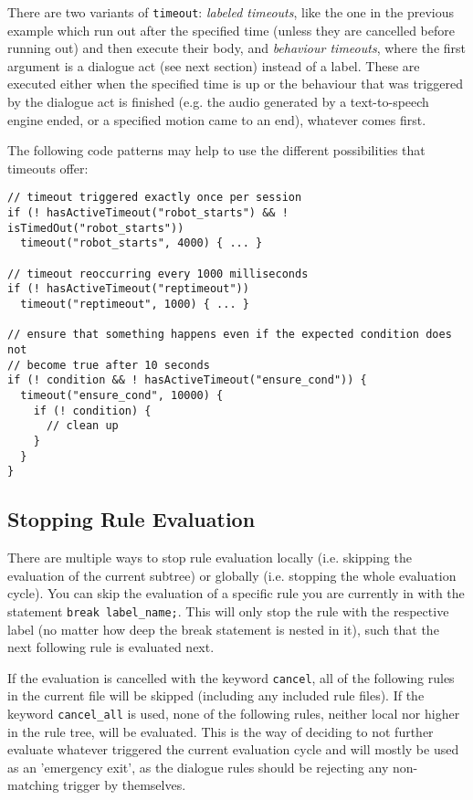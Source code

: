 There are two variants of \texttt{timeout}: \emph{labeled timeouts}, like the
one in the previous example which run out after the specified time (unless they
are cancelled before running out) and then execute their body, and
\emph{behaviour timeouts}, where the first argument is a dialogue act (see next
section) instead of a label. These are executed either when the specified time
is up or the behaviour that was triggered by the dialogue act is finished
(e.g. the audio generated by a text-to-speech engine ended, or a specified
motion came to an end), whatever comes first.

The following code patterns may help to use the different possibilities that
timeouts offer:

{\small%
\begin{lstlisting}
// timeout triggered exactly once per session
if (! hasActiveTimeout("robot_starts") && ! isTimedOut("robot_starts"))
  timeout("robot_starts", 4000) { ... }

// timeout reoccurring every 1000 milliseconds
if (! hasActiveTimeout("reptimeout"))
  timeout("reptimeout", 1000) { ... }

// ensure that something happens even if the expected condition does not
// become true after 10 seconds
if (! condition && ! hasActiveTimeout("ensure_cond")) {
  timeout("ensure_cond", 10000) {
    if (! condition) {
      // clean up
    }
  }
}
\end{lstlisting}}

\subsection{Stopping Rule Evaluation}
\label{sec:cancelrules}
There are multiple ways to stop rule evaluation locally (i.e. skipping the
evaluation of the current subtree) or globally (i.e. stopping the whole
evaluation cycle).
You can skip the evaluation of a specific rule you are currently in with the
statement \texttt{break label\_name;}. This will only stop the rule with the
respective label (no matter how deep the break statement is nested in it), such
that the next following rule is evaluated next.

If the evaluation is cancelled with the keyword \texttt{cancel}, all of the
following rules in the current file will be skipped (including any included
rule files). If the keyword \texttt{cancel\_all} is used, none of the following
rules, neither local nor higher in the rule tree, will be evaluated. This is
the \vonda way of deciding to not further evaluate whatever triggered the
current evaluation cycle and will mostly be used as an 'emergency exit', as the
dialogue rules should be rejecting any non-matching trigger by themselves.

